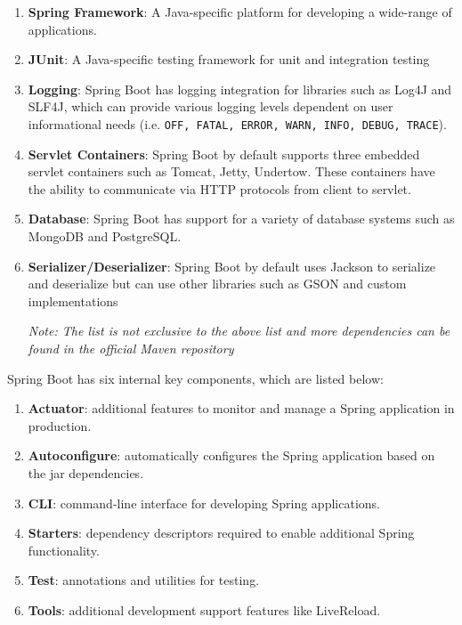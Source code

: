 \begin{enumerate}
  \item \textbf{Spring Framework}: A Java-specific platform for developing a wide-range of applications.
  \item \textbf{JUnit}: A Java-specific testing framework for unit and integration testing
  \item \textbf{Logging}: Spring Boot has logging integration for libraries such as Log4J and SLF4J, which can provide various logging levels dependent on user informational needs (i.e. \texttt{OFF, FATAL, ERROR, WARN, INFO, DEBUG, TRACE}).
  \item \textbf{Servlet Containers}: Spring Boot by default supports three embedded servlet containers such as Tomcat, Jetty, Undertow. These containers have the ability to communicate via HTTP protocols from client to servlet.
  \item \textbf{Database}: Spring Boot has support for a variety of database systems such as MongoDB and PostgreSQL.
  \item \textbf{Serializer/Deserializer}: Spring Boot by default uses Jackson to serialize and deserialize but can use other libraries such as GSON and custom implementations

  \textit{Note: The list is not exclusive to the above list and more dependencies can be found in the official Maven repository}
\end{enumerate}

Spring Boot has six internal key components, which are listed below:

\begin{enumerate}
  \item \textbf{Actuator}: additional features to monitor and manage a Spring application in production.
  \item \textbf{Autoconfigure}: automatically configures the Spring application based on the jar dependencies.
  \item \textbf{CLI}: command-line interface for developing Spring applications.
  \item \textbf{Starters}: dependency descriptors required to enable additional Spring functionality.
  \item \textbf{Test}: annotations and utilities for testing.
  \item \textbf{Tools}: additional development support features like LiveReload.
\end{enumerate}